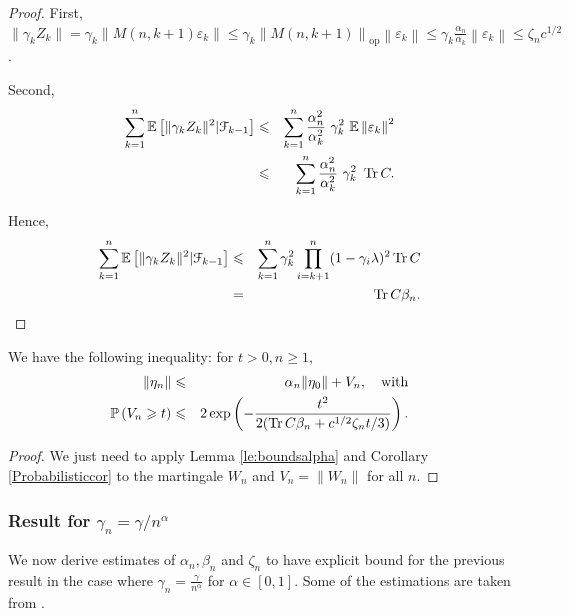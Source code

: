 \begin{proof}
First, $ \|\gamma_k Z_k \| = \gamma_k \left\| M(n,k+1) \varepsilon_k \right\| \leq \gamma_k\left\| M(n,k+1) \right\|_{\text{op}} \left\| \varepsilon_k \right\| \leq \gamma_k\displaystyle \frac{\alpha_n}{\alpha_k} \left\| \varepsilon_k \right\| \leqslant \zeta_n c^{1/2} $. 

Second, 
\begin{eqnarray*}
\sum_{k=1}^n \mathbb{E}\left[ \|\gamma_k Z_k\|^2 | \mathcal{F}_{k-1} \right] 
&\leqslant& \sum_{k=1}^n \displaystyle \frac{\alpha_n^2}{\alpha_k^2}\ \gamma_k^2\  {\mathbb E} \left\| \varepsilon_k  \right\|^2 \\
&\leqslant& \sum_{k=1}^n \displaystyle \frac{\alpha_n^2}{\alpha_k^2}\ \gamma_k^2\  \operatorname{Tr} C.
\end{eqnarray*}

Hence,
\begin{eqnarray*}
\sum_{k=1}^n \mathbb{E}\left[ \|\gamma_k Z_k\|^2 | \mathcal{F}_{k-1} \right]  &\leqslant& \sum_{k=1}^n \gamma_k^2 \prod_{i=k+1}^n (1-\gamma_i \lambda)^2 \operatorname{Tr} C 
\\
&=&  \operatorname{Tr} C \beta_n.      
\end{eqnarray*}
\end{proof}
\begin{proposition}
\label{prop:alphabetazeta}
We have the following inequality: for $t > 0, n \geqslant 1$,
\begin{eqnarray}
 \|\eta_n \| &\leqslant& \alpha_n \|\eta_0\| + V_n, \quad \text{with}\\
{\mathbb P} \left( V_n \geqslant t \right) &\leqslant& 2\exp \left( - \frac{t^2}{2(\operatorname{Tr} C \beta_n + c^{1/2} \zeta_n t / 3)}  \right).
\end{eqnarray}
\end{proposition}
\begin{proof}
We just need to apply Lemma \ref{le:boundsalpha} and Corollary \ref{Probabilisticcor} to the martingale $W_n$ and $V_n = \|W_n\|$ for all $n$.
\end{proof}

\subsubsection{Result for \texorpdfstring{$\gamma_n = \gamma/n^\alpha$}{gamma} }

We now derive estimates of $\alpha_n, \beta_n$ and $\zeta_n$ to have explicit bound for the previous result in the case where $\gamma_n = \displaystyle \frac{\gamma}{n^\alpha}$ for $\alpha \in [0,1]$. Some of the estimations are taken from \citet{gradsto}.

